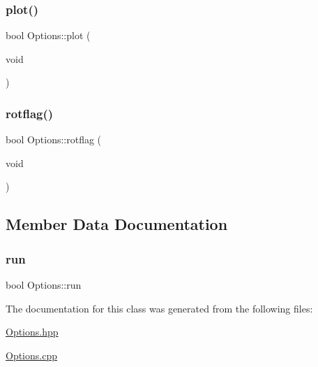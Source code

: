 \subsubsection{\texorpdfstring{plot()}{plot()}}
{\footnotesize\ttfamily bool Options\+::plot (\begin{DoxyParamCaption}\item[{void}]{ }\end{DoxyParamCaption})\hspace{0.3cm}{\ttfamily [inline]}}

\mbox{\label{class_options_a896737c665d9c0ee7a17a0cdedf66bb7}} 
\subsubsection{\texorpdfstring{rotflag()}{rotflag()}}
{\footnotesize\ttfamily bool Options\+::rotflag (\begin{DoxyParamCaption}\item[{void}]{ }\end{DoxyParamCaption})\hspace{0.3cm}{\ttfamily [inline]}}



\subsection{Member Data Documentation}
\mbox{\label{class_options_a762a0775c9b60ceb2737dc90c96f7c0b}} 
\subsubsection{\texorpdfstring{run}{run}}
{\footnotesize\ttfamily bool Options\+::run}



The documentation for this class was generated from the following files\+:\begin{DoxyCompactItemize}
\item 
\mbox{\hyperlink{_options_8hpp}{Options.\+hpp}}\item 
\mbox{\hyperlink{_options_8cpp}{Options.\+cpp}}\end{DoxyCompactItemize}
